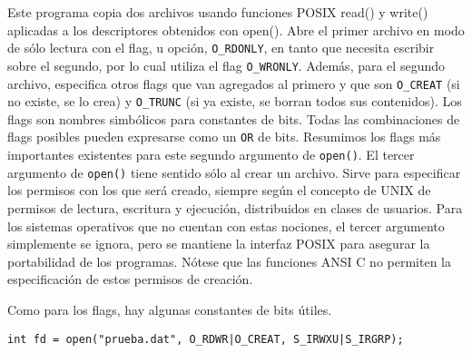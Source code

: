 Este programa copia dos archivos usando funciones POSIX read() y write()
aplicadas a los descriptores obtenidos con open().
Abre el primer archivo en modo de sólo lectura con el flag, u opción, \lstinline{O_RDONLY},
en tanto que necesita escribir sobre el segundo, por lo cual utiliza el flag
\lstinline{O_WRONLY}. Además, para el segundo archivo, especifica otros flags que van
agregados al primero y que son \lstinline{O_CREAT} (si no existe, se lo crea) y \lstinline{O_TRUNC} (si
ya existe, se borran todos sus contenidos).
Los flags son nombres simbólicos para constantes de bits. Todas las
combinaciones de flags posibles pueden expresarse como un \lstinline{OR} de bits. Resumimos
los flags más importantes existentes para este segundo argumento de \lstinline{open()}.
% 
El tercer argumento de \lstinline{open()} tiene sentido sólo al crear un archivo. Sirve
para especificar los permisos con los que será creado, siempre según el
concepto de UNIX de permisos de lectura, escritura y ejecución, distribuidos en
clases de usuarios. Para los sistemas operativos que no cuentan con estas
nociones, el tercer argumento simplemente se ignora, pero se mantiene la
interfaz POSIX para asegurar la portabilidad de los programas.
Nótese que las funciones ANSI C no permiten la especificación de estos permisos
de creación.

Como para los flags, hay algunas constantes de bits útiles.

% 

\begin{ejemplo}
\begin{lstlisting}
int fd = open("prueba.dat", O_RDWR|O_CREAT, S_IRWXU|S_IRGRP);	
\end{lstlisting}
\end{ejemplo}

